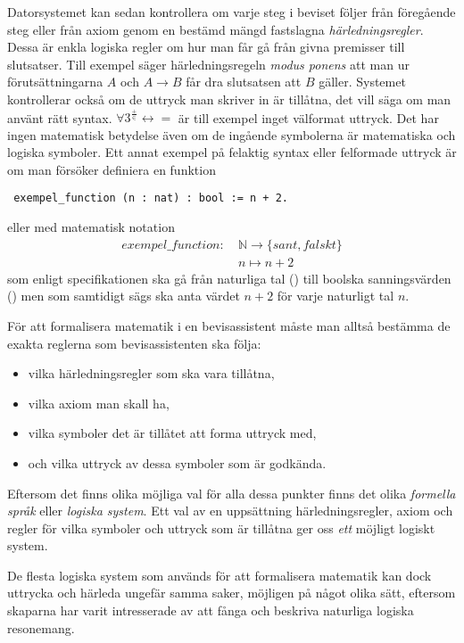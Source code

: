 Datorsystemet kan sedan kontrollera om varje steg i beviset följer från
föregående steg eller från axiom genom en bestämd mängd fastslagna
\emph{härledningsregler}. Dessa är enkla logiska regler om hur man får gå från
givna premisser till slutsatser. Till exempel säger härledningsregeln
\emph{modus ponens} att man ur förutsättningarna $A$ och $A \to B$ får dra
slutsatsen att $B$ gäller. Systemet kontrollerar också om de uttryck man
skriver in är tillåtna, det vill säga om man använt rätt syntax.
$\forall 3^{\frac{+}{\in}} \leftrightarrow =$ är till exempel inget välformat
uttryck. Det har ingen matematisk betydelse även om de ingående symbolerna är
matematiska och logiska symboler. Ett annat exempel på felaktig syntax eller
felformade uttryck är om man försöker definiera en funktion
\begin{lstlisting}
 exempel_function (n : nat) : bool := n + 2.
\end{lstlisting}
eller med matematisk notation
\begin{align*}
  exempel\_function :\ &\mathbb{N} \to \{sant, falskt\} \\
                       &n \mapsto n + 2
\end{align*}
som enligt specifikationen ska gå från naturliga tal () till boolska
sanningsvärden () men som samtidigt sägs ska anta värdet $n + 2$ för
varje naturligt tal $n$.

För att formalisera matematik i en bevisassistent måste man alltså bestämma de
exakta reglerna som bevisassistenten ska följa:
\begin{itemize}
  \item vilka härledningsregler som ska vara tillåtna,
  \item vilka axiom man skall ha,
  \item vilka symboler det är tillåtet att forma uttryck med,
  \item och vilka uttryck av dessa symboler som är godkända.
\end{itemize}
Eftersom det finns olika möjliga val för alla dessa punkter finns det olika
\emph{formella språk} eller \emph{logiska system}. Ett val av en uppsättning
härledningsregler, axiom och regler för vilka symboler och uttryck som är
tillåtna ger oss \emph{ett} möjligt logiskt system.

De flesta logiska system som används för att formalisera matematik kan dock
uttrycka och härleda ungefär samma saker, möjligen på något olika sätt,
eftersom skaparna har varit intresserade av att fånga och beskriva naturliga
logiska resonemang.

